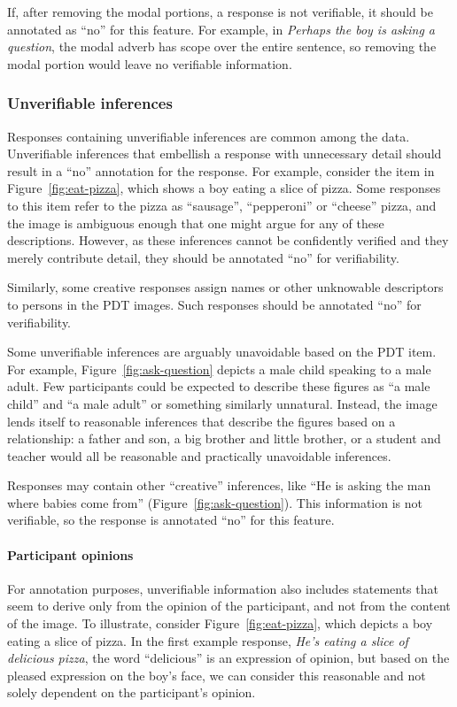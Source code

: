 \documentclass[12pt,notitlepage]{article}
\begin{document}
If, after removing the modal portions, a response is not verifiable, it should be annotated as ``no'' for this feature. For example, in \textit{Perhaps the boy is asking a question}, the modal adverb has scope over the entire sentence, so removing the modal portion would leave no verifiable information.

\subsubsection{Unverifiable inferences} Responses containing unverifiable inferences are common among the data. Unverifiable inferences that embellish a response with unnecessary detail should result in a ``no'' annotation for the response. For example, consider the item in Figure~\ref{fig:eat-pizza}, which shows a boy eating a slice of pizza. Some responses to this item refer to the pizza as ``sausage'', ``pepperoni'' or ``cheese'' pizza, and the image is ambiguous enough that one might argue for any of these descriptions. However, as these inferences cannot be confidently verified and they merely contribute detail, they should be annotated ``no'' for verifiability.

Similarly, some creative responses assign names or other unknowable descriptors to persons in the PDT images. Such responses should be annotated ``no'' for verifiability.

Some unverifiable inferences are arguably unavoidable based on the PDT item. For example, Figure~\ref{fig:ask-question} depicts a male child speaking to a male adult. Few participants could be expected to describe these figures as ``a male child'' and ``a male adult'' or something similarly unnatural. Instead, the image lends itself to reasonable inferences that describe the figures based on a relationship: a father and son, a big brother and little brother, or a student and teacher would all be reasonable and practically unavoidable inferences. 


Responses may contain other ``creative'' inferences, like ``He is asking the man where babies come from'' (Figure~\ref{fig:ask-question}). This information is not verifiable, so the response is annotated ``no'' for this feature.

\paragraph{Participant opinions} For annotation purposes, unverifiable information also includes statements that seem to derive only from the opinion of the participant, and not from the content of the image. To illustrate, consider Figure~\ref{fig:eat-pizza}, which depicts a boy eating a slice of pizza. In the first example response, \textit{He's eating a slice of delicious pizza}, the word ``delicious'' is an expression of opinion, but based on the pleased expression on the boy's face, we can consider this reasonable and not solely dependent on the participant's opinion.
\end{document}

